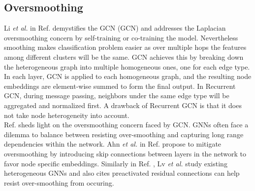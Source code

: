 \documentclass{report} %
\begin{document}
\subsection{Oversmoothing}\label{subsec:HGNN Oversmoothing}
Li \textit{et al.} in Ref. \cite{GCN-2018} demystifies the \acl{GCN} (\ac{GCN}) and addresses the Laplacian oversmoothing concern by self-training or co-training the model.
Nevertheless smoothing makes classification problem easier as over multiple hops the features among different clusters will be the same.
\ac{GCN} achieves this by breaking down the heterogeneous graph into multiple homogeneous ones, one for each edge type. 
In each layer, \ac{GCN} is applied to each homogeneous graph, and the resulting node embeddings are element-wise summed to form the final output. 
In Recurrent \ac{GCN}, during message passing, neighbors under the same edge type will be aggregated and normalized first. 
A drawback of Recurrent \ac{GCN} is that it does not take node heterogeneity into account. \\
Ref. \cite{GCN-2018} sheds light on the oversmoothing concern faced by \ac{GCN}.
\ac{GNN}s often face a dilemma to balance between resisting over-smoothing and capturing long range dependencies within the network.
Ahn \textit{et al.} in Ref. \cite{RHGNN-2022} propose to mitigate oversmoothing by introducing skip connections between layers in the network to favor node specific embeddings.
Similarly in Ref. \cite{REF HGNN-2021}, Lv \textit{et al.} study existing heterogeneous \ac{GNN}s and also cites preactivated residual connections can help resist 
over-smoothing from occuring.
\end{document}
